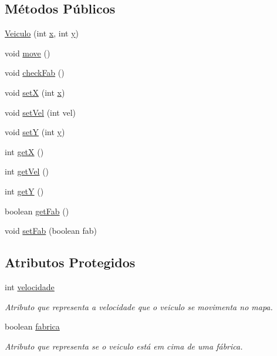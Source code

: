 \subsection*{Métodos Públicos}
\begin{DoxyCompactItemize}
\item 
\mbox{\hyperlink{class_veiculo_a47f634662187ef78027f99a3ab6708a5}{Veiculo}} (int \mbox{\hyperlink{class_veiculo_a069917a284297fe5b385258b2afd9ad6}{x}}, int \mbox{\hyperlink{class_veiculo_af25046404db7c2786c0d9e468bb1fb64}{y}})
\item 
void \mbox{\hyperlink{class_veiculo_a3341b0ed6b4d34db990a31f7a499ae80}{move}} ()
\item 
void \mbox{\hyperlink{class_veiculo_af565d4a9368f62efe67608dbcf18ef2d}{check\+Fab}} ()
\item 
void \mbox{\hyperlink{class_veiculo_a84b2207a013e6cd869959b73a93864b8}{setX}} (int \mbox{\hyperlink{class_veiculo_a069917a284297fe5b385258b2afd9ad6}{x}})
\item 
void \mbox{\hyperlink{class_veiculo_a6d69355a635fa5c8d40ec87e3d6f9c10}{set\+Vel}} (int vel)
\item 
void \mbox{\hyperlink{class_veiculo_a57cb54424b47643d8b388c72dbaf43b1}{setY}} (int \mbox{\hyperlink{class_veiculo_af25046404db7c2786c0d9e468bb1fb64}{y}})
\item 
int \mbox{\hyperlink{class_veiculo_a235b29e1e25ec8c769b20fb2aeba8404}{getX}} ()
\item 
int \mbox{\hyperlink{class_veiculo_ab43d327b067e15c1bc96cee94d495049}{get\+Vel}} ()
\item 
int \mbox{\hyperlink{class_veiculo_a06b2a923e51186673a016f75d10363d3}{getY}} ()
\item 
boolean \mbox{\hyperlink{class_veiculo_a7509d7e1ba79a662b145f8907c4e97c1}{get\+Fab}} ()
\item 
void \mbox{\hyperlink{class_veiculo_af740c4bac90ecf0936dbdab300cf5776}{set\+Fab}} (boolean fab)
\end{DoxyCompactItemize}
\subsection*{Atributos Protegidos}
\begin{DoxyCompactItemize}
\item 
int \mbox{\hyperlink{class_veiculo_a2edf5e3132b1c2504c441dc095dc7e0e}{velocidade}}
\begin{DoxyCompactList}\small\item\em Atributo que representa a velocidade que o veiculo se movimenta no mapa. \end{DoxyCompactList}\item 
boolean \mbox{\hyperlink{class_veiculo_a23d377a69bdf558ebedb5bc35dcdebf5}{fabrica}}
\begin{DoxyCompactList}\small\item\em Atributo que representa se o veiculo está em cima de uma fábrica. \end{DoxyCompactList}\end{DoxyCompactItemize}
